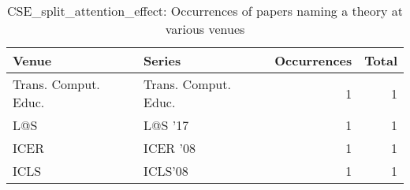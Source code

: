 \begin{table*}[t]
\begin{tabular}{llrr}
Venue & Series & Occurrences & Total\\\hline
\multirow{1}{*}{Trans. Comput. Educ.} & Trans. Comput. Educ. & 1 & \multirow{1}{*}{1}\\
\multirow{1}{*}{L@S } & L@S '17 & 1 & \multirow{1}{*}{1}\\
\multirow{1}{*}{ICER } & ICER '08 & 1 & \multirow{1}{*}{1}\\
\multirow{1}{*}{ICLS} & ICLS'08 & 1 & \multirow{1}{*}{1}\\
\end{tabular}
\caption{CSE\_split\_attention\_effect: Occurrences of papers naming a theory at various venues}
\end{table*}
